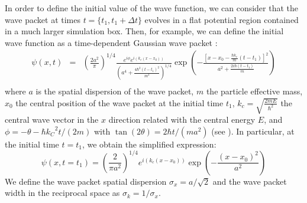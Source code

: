 \documentclass[nofootinbib, secnumarabic, amsmath, nobibnotes,10pt,aps,pra]{revtex4-1}
\begin{document}
In order to define the initial value of the wave function, we can consider that the wave packet at times $t = \{t_1,t_1 + \Delta t\}$ evolves in a flat potential region contained in a much larger simulation box. Then, for example, we can define the  initial wave function as a time-dependent Gaussian wave packet \cite{om.cohen}:
\begin{eqnarray}
\psi (x,t) &=& {{\left( \frac{2{{a}^{2}}}{\pi } \right)}^{1/4}}\frac{{{e}^{i\phi }}{e}^{i(k_c(x-x_0))}}{{{\left( {{a}^{4}} + \frac{4{{\hbar }^{2}}{{(t-{{t}_{1}})}^{2}}}{{{m}^{2}}} \right)}^{1/4}}}\exp \left(-\frac{{{\left[x - {{x}_0} - \frac{\hbar {{k}_{c}}}{m}(t - {{t}_{1}}) \right]}^{2}}}{{{a}^{2}} + \frac{2i\hbar (t - {{t}_{1}})}{m}} \right)\nonumber\\
\label{om.finite-difference_innitial}
\end{eqnarray}
where $a$ is the spatial dispersion of the wave packet, $m$ the particle effective mass, $x_0$ the central position of the wave packet at the initial time $t_1$, ${k}_{c} = \sqrt{\frac{2mE}{{\hbar }^{2}}}$ the central wave vector in the $x$ direction related with the central energy $E$, and $\phi = -\theta - {\hbar {k_C}^{2}t}/{(2m)}$ with $\tan (2 \theta ) = {2 \hbar t}/{(m{{a}^{2}})}$ (see \cite{om.cohen}). In particular, at the initial time $t = t_1$, we obtain the simplified expression:
\begin{equation}
\psi (x,t = t_1) = {{\left( \frac{2}{\pi {{a}^{2}}} \right)}^{1/4}}{{e}^{i\left( {{k}_{c}}(x-{{x}_0}) \right)}} \exp \left( -\frac{{{(x-{{x}_0})}^{2}}}{{{a}^{2}}} \right)
\end{equation}
We define the wave packet spatial dispersion ${{\sigma }_{x}} =
a/\sqrt{2}$ and the wave packet width in the reciprocal  space as
${{\sigma }_{k}} = 1/{{\sigma }_{x}}$.
\end{document}
